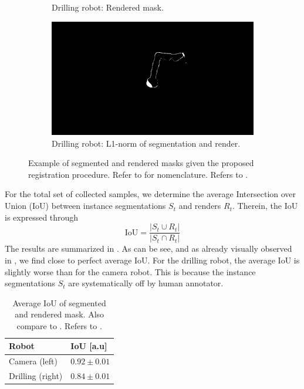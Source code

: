 \begin{figure}[tb]
\begin{subfigure}[b]{0.32\textwidth}
        \caption{Drilling robot: Rendered mask.}
    \end{subfigure}
    \begin{subfigure}[b]{0.32\textwidth}
        \includegraphics[width=\textwidth]{chapter_1/img/drill_left_difference_1.png}
        \caption{Drilling robot: L1-norm of segmentation and render.}
    \end{subfigure}
    \caption{Example of segmented and rendered masks given the proposed registration procedure. Refer to  for nomenclature. Refers to .}
    \label{c1:fig:masks}
\end{figure}

For the total set of collected samples, we determine the average Intersection over Union (IoU) between instance segmentations $S_t$ and renders $R_t$. Therein, the IoU is expressed through
\begin{equation}
    \text{IoU} = \frac{|S_t \cup R_t|}{|S_t \cap R_t|}
\end{equation}
The results are summarized in . As can be see, and as already visually observed in , we find close to perfect average IoU. For the drilling robot, the average IoU is slightly worse than for the camera robot. This is because the instance segmentations $S_t$ are systematically off by human annotator.
\begin{table}[tb]
\centering
\caption{Average IoU of segmented and rendered mask. Also compare to . Refers to .}
\label{c1:tab:iou}
\begin{tabular}{@{}ll@{}}
\toprule
Robot         & IoU {[}a.u{]}   \\ \midrule
Camera (left)    & $0.92 \pm 0.01$ \\
Drilling (right) & $0.84 \pm 0.01$ \\ \bottomrule
\end{tabular}
\end{table}

